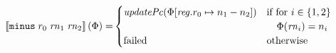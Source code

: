 \documentclass[a3paper]{article}
\newcommand{\sem}[1]{\left\llbracket #1 \right\rrbracket}
\newcommand{\targetcolor}[1]{\color{black}}
\newcommand{\trg}[1]{{\targetcolor{} #1}}
\newcommand{\zinstr}[1]{\texttt{#1}}
\newcommand{\threeinstr}[4]{
  \ifthenelse{\equal{#2#3#4}{}}
  {\zinstr{#1}}
  {\zinstr{#1} \; #2 \; #3 \; #4}
}
\newcommand{\tminus}[3]{\threeinstr{\trg{minus}}{#1}{#2}{#3}}
\newcommand{\update}[2]{[#1 \mapsto #2]}
\newcommand{\updReg}[2]{\update{\reg.#1}{#2}}
\newcommand{\failed}{\mathrm{failed}}
\newcommand{\var}[1]{\mathit{#1}}
\newcommand{\rn}{\var{rn}}
\newcommand{\reg}{\var{reg}}
\newcommand{\plainfun}[2]{
  \ifthenelse{\equal{#2}{}}
  {\mathit{#1}}
  {\mathit{#1}(#2)}
}
\newcommand{\updPcAddr}[1]{\plainfun{updatePc}{#1}}
\begin{document}
\begin{align*}
  \sem{\tminus{r_0}{\rn_1}{\rn_2}}(\Phi) = &
                                                  \begin{cases}
                                                    \updPcAddr{\Phi\updReg{r_0}{n_1-n_2}} &
                                                    \arraycolsep=0pt
                                                    \begin{array}[t]{l}
                                                      \text{if for $i \in \{1,2\}$}\\
                                                      \quad\Phi(\rn_i) = n_i\\
                                                    \end{array}\\
                                                    \failed & \text{otherwise}
                                                  \end{cases}  
\end{align*}
\end{document}
